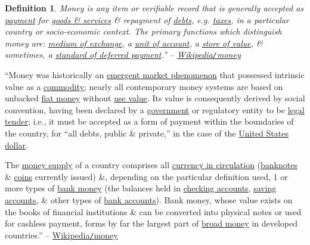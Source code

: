 \documentclass{article}
\newtheorem{definition}{Definition}
\begin{document}
\begin{definition}
	\emph{Money} is any item or verifiable record that is generally accepted as \href{https://en.wikipedia.org/wiki/Payment}{payment} for \href{https://en.wikipedia.org/wiki/Goods_and_services}{goods \& services} \& repayment of \href{https://en.wikipedia.org/wiki/Debt}{debts}, e.g. \href{https://en.wikipedia.org/wiki/Taxes}{taxes}, in a particular country or socio-economic context. The primary functions which distinguish money are: \href{https://en.wikipedia.org/wiki/Medium_of_exchange}{medium of exchange}, a \href{https://en.wikipedia.org/wiki/Unit_of_account}{unit of account}, a \href{https://en.wikipedia.org/wiki/Store_of_value}{store of value}, \& sometimes, a \href{https://en.wikipedia.org/wiki/Standard_of_deferred_payment}{standard of deferred payment}.'' -- \href{https://en.wikipedia.org/wiki/Money}{Wikipedia{\tt/}money}
\end{definition}
``Money was historically an \href{https://en.wikipedia.org/wiki/Emergence#Economics}{emergent market phenomenon} that possessed intrinsic value as a \href{https://en.wikipedia.org/wiki/Commodity_money}{commodity}; nearly all contemporary money systems are based on unbacked \href{https://en.wikipedia.org/wiki/Fiat_money}{fiat money} without \href{https://en.wikipedia.org/wiki/Use_value}{use value}. Its value is consequently derived by social convention, having been declared by a \href{https://en.wikipedia.org/wiki/Government}{government} or regulatory entity to be \href{https://en.wikipedia.org/wiki/Legal_tender}{legal tender}; i.e., it must be accepted as a form of payment within the boundaries of the country, for ``all debts, public \& private,'' in the case of the \href{https://en.wikipedia.org/wiki/United_States_dollar}{United States dollar}.
	
The \href{https://en.wikipedia.org/wiki/Money_supply}{money supply} of a country comprises all \href{https://en.wikipedia.org/wiki/Currency_in_circulation}{currency in circulation} (\href{https://en.wikipedia.org/wiki/Banknote}{banknotes} \& \href{https://en.wikipedia.org/wiki/Coin}{coins} currently issued) \&, depending on the particular definition used, 1 or more types of \href{https://en.wikipedia.org/wiki/Demand_deposit}{bank money} (the balances held in \href{https://en.wikipedia.org/wiki/Transactional_account}{checking accounts}, \href{https://en.wikipedia.org/wiki/Savings_account}{saving accounts}, \& other types of \href{https://en.wikipedia.org/wiki/Bank_accounts}{bank accounts}). Bank money, whose value exists on the books of financial institutions \& can be converted into physical notes or used for cashless payment, forms by far the largest part of \href{https://en.wikipedia.org/wiki/Broad_money}{broad money} in developed countries.'' -- \href{https://en.wikipedia.org/wiki/Money}{Wikipedia{\tt/}money}
\end{document}
